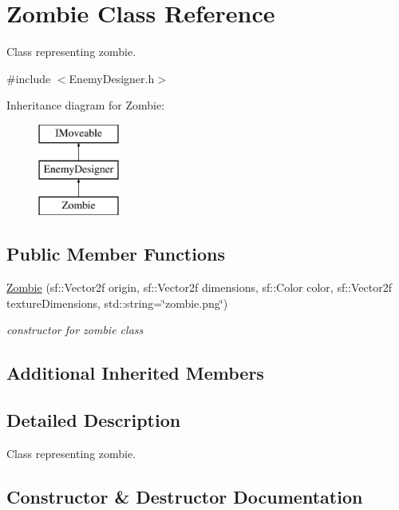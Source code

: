 \hypertarget{class_zombie}{}\section{Zombie Class Reference}
\label{class_zombie}


Class representing zombie.  




{\ttfamily \#include $<$Enemy\+Designer.\+h$>$}

Inheritance diagram for Zombie\+:\begin{figure}[H]
\begin{center}
\leavevmode
\includegraphics[height=3.000000cm]{class_zombie}
\end{center}
\end{figure}
\subsection*{Public Member Functions}
\begin{DoxyCompactItemize}
\item 
\mbox{\hyperlink{class_zombie_ae090d581d9788f7cd13a474f6f3f2667}{Zombie}} (sf\+::\+Vector2f origin, sf\+::\+Vector2f dimensions, sf\+::\+Color color, sf\+::\+Vector2f texture\+Dimensions, std\+::string=\char`\"{}zombie.\+png\char`\"{})
\begin{DoxyCompactList}\small\item\em constructor for zombie class \end{DoxyCompactList}\end{DoxyCompactItemize}
\subsection*{Additional Inherited Members}


\subsection{Detailed Description}
Class representing zombie. 

\subsection{Constructor \& Destructor Documentation}
\mbox{\label{class_zombie_ae090d581d9788f7cd13a474f6f3f2667}} 
